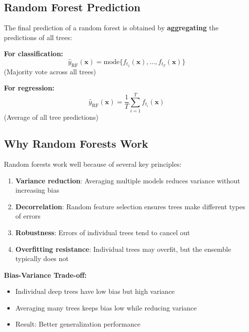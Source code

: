 \documentclass[11pt,a4paper]{article}
\theoremstyle{definition}
\theoremstyle{plain}
\theoremstyle{remark}
\begin{document}
\subsection{Random Forest Prediction}

The final prediction of a random forest is obtained by \textbf{aggregating} the predictions of all trees:

\begin{tcolorbox}[colback=green!5!white,colframe=green!75!black,title=\textbf{Random Forest Prediction}]
\textbf{For classification:}
\[
\hat{y}_{\text{RF}}(\mathbf{x}) = \text{mode}\{f_{t_1}(\mathbf{x}), \ldots, f_{t_T}(\mathbf{x})\}
\]
(Majority vote across all trees)

\textbf{For regression:}
\[
\hat{y}_{\text{RF}}(\mathbf{x}) = \frac{1}{T} \sum_{i=1}^{T} f_{t_i}(\mathbf{x})
\]
(Average of all tree predictions)
\end{tcolorbox}

\subsection{Why Random Forests Work}

Random forests work well because of several key principles:

\begin{enumerate}
    \item \textbf{Variance reduction}: Averaging multiple models reduces variance without increasing bias
    
    \item \textbf{Decorrelation}: Random feature selection ensures trees make different types of errors
    
    \item \textbf{Robustness}: Errors of individual trees tend to cancel out
    
    \item \textbf{Overfitting resistance}: Individual trees may overfit, but the ensemble typically does not
\end{enumerate}

\textbf{Bias-Variance Trade-off:}
\begin{itemize}
    \item Individual deep trees have low bias but high variance
    \item Averaging many trees keeps bias low while reducing variance
    \item Result: Better generalization performance
\end{itemize}
\end{document}
